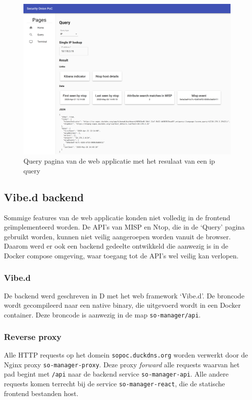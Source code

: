 \documentclass[a4paper,12pt]{report}
\begin{document}
\begin{figure}[H]
  \centering
  \includegraphics[width=\textwidth]{so-manager-query}
  \caption{Query pagina van de web applicatie met het resulaat van een ip query}
  \label{fig:so-manager-query}
\end{figure}

\subsection{Vibe.d backend}
Sommige features van de web applicatie konden niet volledig in de frontend geïmplementeerd worden.
De API's van MISP en Ntop, die in de `Query' pagina gebruikt worden, kunnen niet veilig aangeroepen worden vanuit de browser.
Daarom werd er ook een backend gedeelte ontwikkeld die aanwezig is in de Docker compose omgeving, waar toegang tot de API's wel veilig kan verlopen.

\subsubsection{Vibe.d}
De backend werd geschreven in D met het web framework `Vibe.d'.
De broncode wordt gecompileerd naar een native binary, die uitgevoerd wordt in een Docker container.
Deze broncode is aanwezig in de map \lstinline|so-manager/api|.

\subsubsection{Reverse proxy}
Alle HTTP requests op het domein \lstinline|sopoc.duckdns.org| worden verwerkt door de Nginx proxy \lstinline|so-manager-proxy|.
Deze proxy \emph{forward} alle requests waarvan het pad begint met \lstinline|/api| naar de backend service \lstinline|so-manager-api|.
Alle andere requests komen terrecht bij de service \lstinline|so-manager-react|, die de statische frontend bestanden host.
\end{document}
